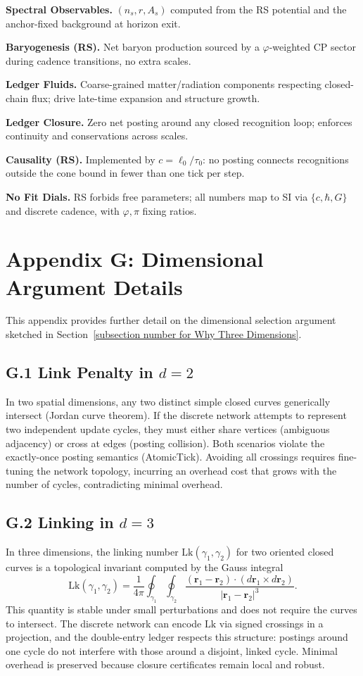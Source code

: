 \documentclass[11pt]{article}
\theoremstyle{definition}
\theoremstyle{remark}
\begin{document}
\noindent
\textbf{Spectral Observables.} \((n_s,r,A_s)\) computed from the RS potential and the anchor-fixed background at horizon exit.

\noindent
\textbf{Baryogenesis (RS).} Net baryon production sourced by a \(\varphi\)-weighted CP sector during cadence transitions, no extra scales.

\noindent
\textbf{Ledger Fluids.} Coarse-grained matter/radiation components respecting closed-chain flux; drive late-time expansion and structure growth.

\noindent
\textbf{Ledger Closure.} Zero net posting around any closed recognition loop; enforces continuity and conservations across scales.

\noindent
\textbf{Causality (RS).} Implemented by \(c=\ell_0/\tau_0\): no posting connects recognitions outside the cone bound in fewer than one tick per step.

\noindent
\textbf{No Fit Dials.} RS forbids free parameters; all numbers map to SI via \(\{c,\hbar,G\}\) and discrete cadence, with \(\varphi,\pi\) fixing ratios.

\section*{Appendix G: Dimensional Argument Details}
\label{app:dimension}

This appendix provides further detail on the dimensional selection argument sketched in Section~\ref{subsection number for Why Three Dimensions}.

\subsection*{G.1 Link Penalty in \(d=2\)}
In two spatial dimensions, any two distinct simple closed curves generically intersect (Jordan curve theorem). If the discrete network attempts to represent two independent update cycles, they must either share vertices (ambiguous adjacency) or cross at edges (posting collision). Both scenarios violate the exactly-once posting semantics (AtomicTick). Avoiding all crossings requires fine-tuning the network topology, incurring an overhead cost that grows with the number of cycles, contradicting minimal overhead.

\subsection*{G.2 Linking in \(d=3\)}
In three dimensions, the linking number \(\mathrm{Lk}(\gamma_1,\gamma_2)\) for two oriented closed curves is a topological invariant computed by the Gauss integral
\[
\mathrm{Lk}(\gamma_1,\gamma_2) = \frac{1}{4\pi}\oint_{\gamma_1}\oint_{\gamma_2}\frac{(\mathbf{r}_1-\mathbf{r}_2)\cdot(d\mathbf{r}_1\times d\mathbf{r}_2)}{|\mathbf{r}_1-\mathbf{r}_2|^3}.
\]
This quantity is stable under small perturbations and does not require the curves to intersect. The discrete network can encode \(\mathrm{Lk}\) via signed crossings in a projection, and the double-entry ledger respects this structure: postings around one cycle do not interfere with those around a disjoint, linked cycle. Minimal overhead is preserved because closure certificates remain local and robust.
\end{document}
